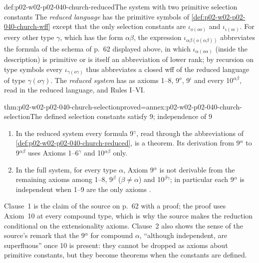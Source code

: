 \begin{hbdefinition}{def:p02-w02-p02-040-church-reduced}{The system with two primitive selection constants}
The \emph{reduced language} has the primitive symbols of
\cref{def:p02-w02-p02-040-church-wff} except that the only selection
constants are \(\iota_{o(oo)}\) and \(\iota_{\iota(o\iota)}\).  For every other
type \(\gamma\), which has the form \(\alpha\beta\), the expression
\(\iota_{\alpha\beta(o(\alpha\beta))}\) abbreviates the formula of the schema
of p.~62 displayed above, in which \(\iota_{\alpha(o\alpha)}\) (inside the
description) is primitive or is itself an abbreviation of lower rank; by
recursion on type symbols every \(\iota_{\gamma(o\gamma)}\) thus abbreviates a
closed wff of the reduced language of type \(\gamma(o\gamma)\).  The
\emph{reduced system} has as axioms 1--8, 9\(^o\), 9\(^\iota\) and every
10\(^{\alpha\beta}\), read in the reduced language, and Rules I--VI.
\end{hbdefinition}

\begin{hbtheorem}{thm:p02-w02-p02-040-church-selection}{proved=annex:p02-w02-p02-040-church-selection}{The defined selection constants satisfy 9; independence of 9}
\begin{enumerate}
 \item In the reduced system every formula 9\(^\gamma\), read through the
   abbreviations of \cref{def:p02-w02-p02-040-church-reduced}, is a theorem.
   Its derivation from 9\(^\alpha\) to 9\(^{\alpha\beta}\) uses Axioms
   1--6\(^\gamma\) and 10\(^{\alpha\beta}\) only.
 \item In the full system, for every type \(\alpha\), Axiom 9\(^\alpha\) is not
   derivable from the remaining axioms among 1--8, 9\(^\beta\) (\(\beta\neq\alpha\))
   and 10\(^{\beta\gamma}\); in particular each 9\(^\alpha\) is independent when
   1--9 are the only axioms \cite[\S4, p.~62]{Church1940}.
\end{enumerate}
\end{hbtheorem}

Clause~1 is the claim of the source on p.~62 with a proof; the proof uses
Axiom~10 at every compound type, which is why the source makes the
reduction conditional on the extensionality axioms.  Clause~2 also shows the
sense of the source's remark that the 9\(^\alpha\) for compound \(\alpha\),
``although independent, are superfluous'' once 10 is present: they cannot be
dropped as axioms about primitive constants, but they become theorems when
the constants are defined.

